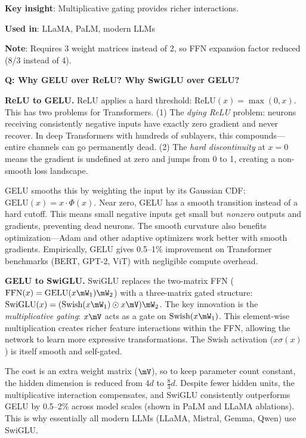 \textbf{Key insight}: Multiplicative gating provides richer interactions.

\textbf{Used in}: LLaMA, PaLM, modern LLMs

\textbf{Note}: Requires 3 weight matrices instead of 2, so FFN expansion factor reduced (8/3 instead of 4).


\begin{interviewq}
\textbf{Q: Why GELU over ReLU? Why SwiGLU over GELU?}

 \quad {} \quad \badgefreq{\freqhigh}

\stronganswer

\textbf{ReLU to GELU.} ReLU applies a hard threshold: $\text{ReLU}(x) = \max(0,x)$. This has two problems for Transformers. (1) The \textit{dying ReLU} problem: neurons receiving consistently negative inputs have exactly zero gradient and never recover. In deep Transformers with hundreds of sublayers, this compounds---entire channels can go permanently dead. (2) The \textit{hard discontinuity} at $x=0$ means the gradient is undefined at zero and jumps from 0 to 1, creating a non-smooth loss landscape.

GELU smooths this by weighting the input by its Gaussian CDF: $\text{GELU}(x) = x \cdot \Phi(x)$. Near zero, GELU has a smooth transition instead of a hard cutoff. This means small negative inputs get small but \textit{nonzero} outputs and gradients, preventing dead neurons. The smooth curvature also benefits optimization---Adam and other adaptive optimizers work better with smooth gradients. Empirically, GELU gives 0.5--1\% improvement on Transformer benchmarks (BERT, GPT-2, ViT) with negligible compute overhead.

\textbf{GELU to SwiGLU.} SwiGLU replaces the two-matrix FFN ($\text{FFN}(x) = \text{GELU}(x\mW_1)\mW_2$) with a three-matrix gated structure: $\text{SwiGLU}(x) = (\text{Swish}(x\mW_1) \odot x\mV)\mW_2$. The key innovation is the \textit{multiplicative gating}: $x\mV$ acts as a gate on $\text{Swish}(x\mW_1)$. This element-wise multiplication creates richer feature interactions within the FFN, allowing the network to learn more expressive transformations. The Swish activation ($x\sigma(x)$) is itself smooth and self-gated.

The cost is an extra weight matrix ($\mV$), so to keep parameter count constant, the hidden dimension is reduced from $4d$ to $\frac{8}{3}d$. Despite fewer hidden units, the multiplicative interaction compensates, and SwiGLU consistently outperforms GELU by 0.5--2\% across model scales (shown in PaLM and LLaMA ablations). This is why essentially all modern LLMs (LLaMA, Mistral, Gemma, Qwen) use SwiGLU.


\end{interviewq}
